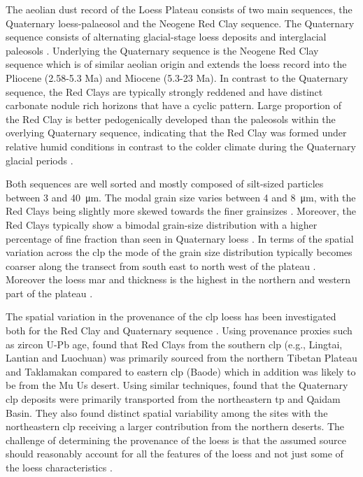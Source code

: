 The aeolian dust record of the Loess Plateau consists of two main sequences, the Quaternary loess-palaeosol and the Neogene Red Clay sequence. The Quaternary sequence consists of alternating glacial-stage loess deposits and interglacial paleosols \parencite{maher2016palaeoclimatic}. 
Underlying the Quaternary sequence is the Neogene Red Clay sequence which is of similar aeolian origin and extends the loess record into the Pliocene (2.58-5.3 Ma) and Miocene (5.3-23 Ma). 
In contrast to the Quaternary sequence, the Red Clays are typically strongly reddened and have distinct carbonate nodule rich horizons that have a cyclic pattern. Large proportion of the Red Clay is better pedogenically developed than the paleosols within the overlying Quaternary sequence, indicating that the Red Clay was formed under relative humid conditions in contrast to the colder climate during the Quaternary glacial periods \parencite{yang2004comparison}. 

Both sequences are well sorted and mostly composed of silt-sized particles between 3 and \SI{40}{\micro\metre}\parencite{maher2016palaeoclimatic}. 
The modal grain size varies between 4 and \SI{8}{\micro\metre}, with the Red Clays being slightly more skewed towards the finer grainsizes \parencite{maher2016palaeoclimatic,sun2002grain, sun2006grain}. 
Moreover, the Red Clays typically show a bimodal grain-size distribution with a higher percentage of fine fraction than seen in Quaternary loess \parencite{sun2002grain}.
In terms of the spatial variation across the \acrshort{clp} the mode of the grain size distribution typically becomes coarser along the transect from south east to north west of the plateau \parencite{ding2000re}. 
Moreover the loess \acrfull{mar} and thickness is the highest in the northern and western part of the plateau \parencite{maher2016palaeoclimatic}.    

The spatial variation in the provenance of the \acrshort{clp} loess has been investigated both for the  Red Clay \parencite{shang2016variations} and Quaternary sequence \parencite{bird2015quaternary}. 
Using provenance proxies such as zircon U-Pb age, \textcite{shang2016variations} found that Red Clays from the southern \acrshort{clp}  (e.g., Lingtai, Lantian and Luochuan) was primarily sourced from the northern Tibetan Plateau and Taklamakan compared to eastern \acrshort{clp} (Baode) which in addition was likely to be from the Mu Us desert. 
Using similar techniques, \textcite{bird2015quaternary} found that the Quaternary \acrshort{clp} deposits were primarily transported from the northeastern \acrfull{tp} and Qaidam Basin. They also found distinct spatial variability among the sites with the northeastern \acrshort{clp} receiving a larger contribution from the northern deserts.   
The challenge of determining the provenance of the loess is that the assumed source should reasonably account for all the features of the loess and not just some of the loess characteristics \parencite{maher2016palaeoclimatic}.


